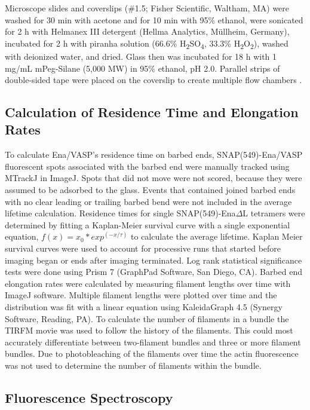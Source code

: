 Microscope slides and coverslips (\#1.5; Fisher Scientific, Waltham, MA) were washed for 30 min with acetone and for 10 min with 95\% ethanol, were sonicated for 2 h with Helmanex III detergent (Hellma Analytics, M\"ullheim, Germany), incubated for 2 h with piranha solution (66.6\% H\textsubscript{2}SO\textsubscript{4}, 33.3\% H\textsubscript{2}O\textsubscript{2}), washed with deionized water, and dried. Glass then was incubated for 18 h with 1 mg/mL mPeg-Silane (5,000 MW) in 95\% ethanol, pH 2.0. Parallel strips of double-sided tape were placed on the coverslip to create multiple flow chambers \citep{zimmermann_vitro_2016}. 

\subsection{Calculation of Residence Time and Elongation Rates}\label{ena-mm-resi-elong-measure}

To calculate Ena/VASP's residence time on barbed ends, SNAP(549)-Ena/VASP fluorescent spots associated with the barbed end were manually tracked using MTrackJ \citep{meijering_chapter_2012} in ImageJ. Spots that did not move were not scored, because they were assumed to be adsorbed to the glass. Events that contained joined barbed ends with no clear leading or trailing barbed bend were not included in the average lifetime calculation. Residence times for single SNAP(549)-Ena$\Delta$L tetramers were determined by fitting a Kaplan-Meier \citep{kaplan_nonparametric_1958} survival curve with a single exponential equation, $f(x) = x_{0} * exp^{(-x/\tau)}$ to calculate the average lifetime. Kaplan Meier survival curves were used to account for processive runs that started before imaging began or ends after imaging terminated. Log rank statistical significance tests were done using Prism 7 (GraphPad Software, San Diego, CA). Barbed end elongation rates were calculated by measuring filament lengths over time with ImageJ software. Multiple filament lengths were plotted over time and the distribution was fit with a linear equation using KaleidaGraph 4.5 (Synergy Software, Reading, PA). To calculate the number of filaments in a bundle the TIRFM movie was used to follow the history of the filaments. This could most accurately differentiate between two-filament bundles and three or more filament bundles. Due to photobleaching of the filaments over time the actin fluorescence was not used to determine the number of filaments within the bundle.

\subsection{Fluorescence Spectroscopy}\label{ena-mm-pyrene}

